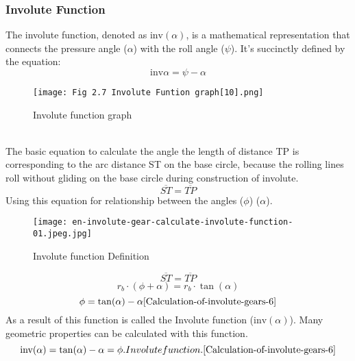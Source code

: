 \documentclass{article}
\begin{document}
\subsubsection{Involute Function}
The involute function, denoted as \( \mathrm{inv}(\alpha) \), is a mathematical representation that connects the pressure angle (\( \alpha \)) with the roll angle (\( \psi \)). It’s succinctly defined by the equation:
\begin{equation}
    \mathrm{inv}\alpha=\psi-\alpha
\end{equation}
\begin{figure}[h]
    \centering
    \texttt{[image: Fig 2.7 Involute Funtion graph[10].png]}
    \caption{Involute function graph\cite{ChadGlinsky10}}
    \label{fig:enter-label}
\end{figure} \\
The basic equation to calculate the angle the length of distance TP is corresponding to the arc distance ST on the base circle, because the rolling lines roll without gliding on the base circle during construction of involute. \cite{Calculation-of-involute-gears-6}
\begin{equation}
    \overline{ST} = \overline{TP}
\end{equation}
Using this equation for relationship between the angles ($\phi$)  ($\alpha$).
\begin{figure}[h]
    \centering
    \texttt{[image: en-involute-gear-calculate-involute-function-01.jpeg.jpg]}
    \caption{Involute function Definition \cite{Calculation-of-involute-gears-6}}
    \label{fig:enter-label}
\end{figure}
\begin{equation}
    \overline{ST} = \overline{TP}
\end{equation}
\begin{equation}
    r_b \cdot (\phi + \alpha) = r_b \cdot \tan(\alpha)
\end{equation}
\begin{equation}
    \phi = \tan(\alpha) - \alpha \cite{Calculation-of-involute-gears-6}
\end{equation}
As a result of this function is called the Involute function ($\text{inv}(\alpha)$). Many geometric properties can be calculated with this function.
\begin{equation}
    \text{inv}(\alpha) = \tan(\alpha) - \alpha = \phi. Involute function.\cite{Calculation-of-involute-gears-6}
\end{equation}
\end{document}
